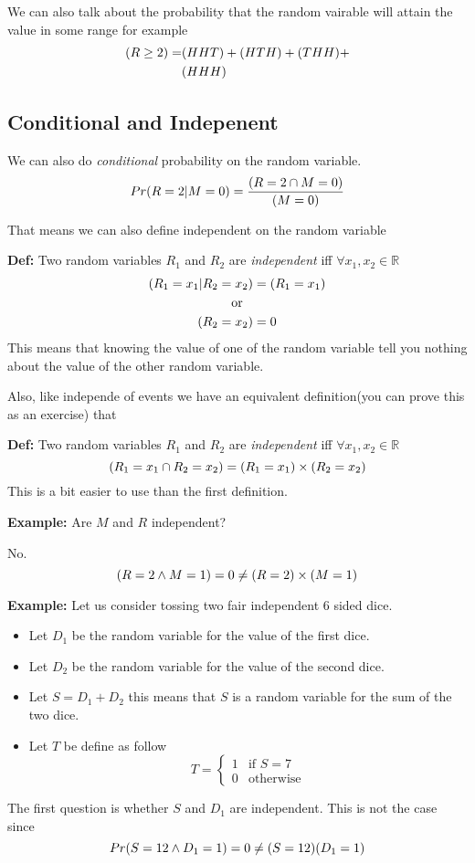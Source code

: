 \documentclass[a4paper, 12pt]{article}
\newcommand{\real}{\mathbb{R}}
\newcommand{\definition}{\vspace{1em}\noindent\textbf{Def:} }
\newcommand{\example}{\vspace{1em}\noindent\textbf{Example:} }
\let\Pr\relax
\DeclareMathOperator{\Pr}{Pr}
\begin{document}
\begin{multicols}{2}
We can also talk about the probability that the random vairable will attain the value in some range for example
\begin{align*}
	\Pr(R \ge 2) =& \Pr(HHT) + \Pr(HTH) + \Pr(THH)+ \\
	& \Pr(HHH)
\end{align*}

\subsection*{Conditional and Indepenent}

We can also do \emph{conditional} probability on the random variable.
\[
	Pr(R=2 | M = 0) = \frac{\Pr(R=2 \cap M=0)}{\Pr(M=0)}
\]

That means we can also define independent on the random variable

\definition Two random variables $R_1$ and $R_2$ are \emph{independent} iff $\forall x_1, x_2 \in \real$
\begin{gather*}
	\Pr(R_1=x_1 | R_2=x_2) = \Pr(R_1=x_1) \\
	\text{or} \\
	\Pr(R_2 = x_2) = 0
\end{gather*}
This means that knowing the value of one of the random variable tell you nothing about the value of the other random variable.

Also, like independe of events we have an equivalent definition(you can prove this as an exercise) that

\definition Two random variables $R_1$ and $R_2$ are \emph{independent} iff $\forall x_1, x_2 \in \real$
\[
	\Pr(R_1=x_1 \cap R_2 = x_2) = \Pr(R_1=x_1) \times \Pr(R_2=x_2)
\]
This is a bit easier to use than the first definition.

\example Are $M$ and $R$ independent?

No.
\[
	\Pr(R=2 \land M=1) = 0 \ne \Pr(R=2) \times \Pr(M=1)
\]

\example Let us consider tossing two fair independent 6 sided dice.
\begin{itemize}
	\item Let $D_1$ be the random variable for the value of the first dice.
	\item Let $D_2$ be the random variable for the value of the second dice.
	\item Let $S=D_1+D_2$ this means that $S$ is a random variable for the sum of the two dice.
	\item Let $T$ be define as follow
	\[
		T = \begin{cases}
		1 & \text{if }S=7\\
		0 & \text{otherwise}
		\end{cases}
	\]
\end{itemize}
The first question is whether $S$ and $D_1$ are independent. This is not the case since
\[
	Pr(S=12 \land D_1 = 1) = 0 \ne \Pr(S=12)\Pr(D_1=1)
\]


\end{multicols}
\end{document}
